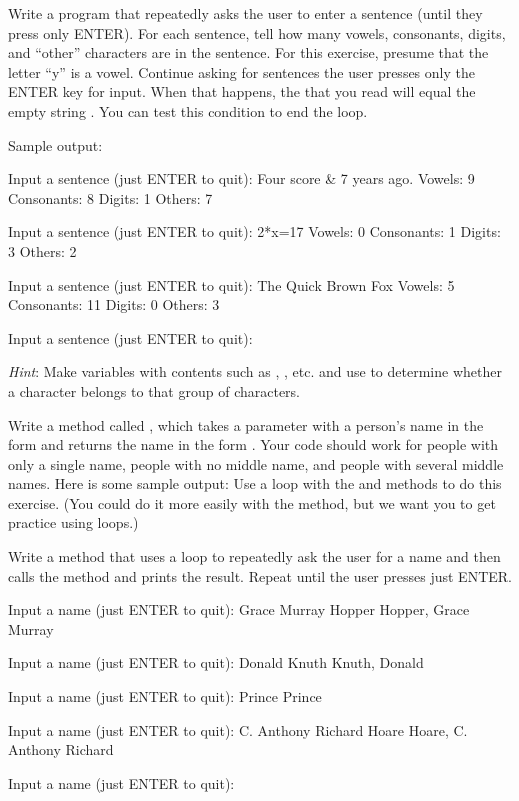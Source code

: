 \begin{exercise}
Write a program that repeatedly asks the user to enter a sentence (until they press only ENTER). For each sentence, tell how many vowels, consonants, digits, and ``other'' characters are in the sentence.  For this exercise, presume that the letter ``y'' is a vowel. Continue asking for sentences the user presses only the ENTER key for input. When that happens, the  that you read will equal the empty string . You can test this condition to end the loop.

Sample output:

\begin{stdout}
Input a sentence (just ENTER to quit): Four score & 7 years ago.
Vowels:   9  Consonants:  8
Digits:   1  Others:      7

Input a sentence (just ENTER to quit): 2*x=17
Vowels:   0  Consonants:  1
Digits:   3  Others:      2

Input a sentence (just ENTER to quit): The Quick Brown Fox
Vowels:   5  Consonants: 11
Digits:   0  Others:      3

Input a sentence (just ENTER to quit):
\end{stdout}

{\em Hint}: Make  variables with contents such as , , etc. and use  to determine whether a character belongs to that group of characters.

\end{exercise}

\begin{exercise}
Write a method called , which takes a  parameter with a person's name in the form  and returns the name in the form .  Your code should work for people with only a single name, people with no middle name, and people with several middle names. Here is some sample output:
Use a  loop with the  and  methods to do this exercise. (You could do it more easily with the  method, but we want you to get practice using loops.)

Write a  method that uses a  loop to repeatedly ask the user for a name and then calls the  method and prints the result. Repeat until the user presses just ENTER.

\begin{stdout}
Input a name (just ENTER to quit): Grace Murray Hopper
Hopper, Grace Murray

Input a name (just ENTER to quit): Donald Knuth   
Knuth, Donald

Input a name (just ENTER to quit): Prince
Prince

Input a name (just ENTER to quit): C. Anthony Richard Hoare
Hoare, C. Anthony Richard

Input a name (just ENTER to quit): 
\end{stdout}

\end{exercise}


